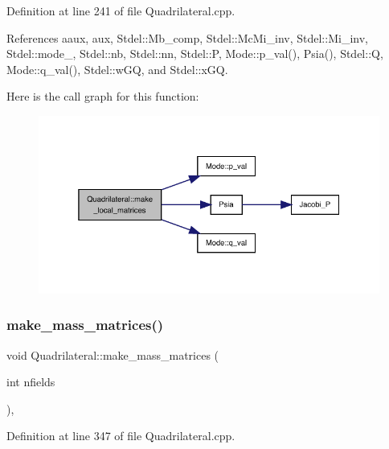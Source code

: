 Definition at line 241 of file Quadrilateral.\+cpp.



References aaux, aux, Stdel\+::\+Mb\+\_\+comp, Stdel\+::\+Mc\+Mi\+\_\+inv, Stdel\+::\+Mi\+\_\+inv, Stdel\+::mode\+\_\+, Stdel\+::nb, Stdel\+::nn, Stdel\+::P, Mode\+::p\+\_\+val(), Psia(), Stdel\+::Q, Mode\+::q\+\_\+val(), Stdel\+::w\+GQ, and Stdel\+::x\+GQ.

Here is the call graph for this function\+:
\nopagebreak
\begin{figure}[H]
\begin{center}
\leavevmode
\includegraphics[width=338pt]{classQuadrilateral_a250590faeb6a0218430f02ee040a1818_cgraph}
\end{center}
\end{figure}
\mbox{\label{classQuadrilateral_ac1150bb15b39c343031413121c767d70}} 
\subsubsection{\texorpdfstring{make\+\_\+mass\+\_\+matrices()}{make\_mass\_matrices()}}
{\footnotesize\ttfamily void Quadrilateral\+::make\+\_\+mass\+\_\+matrices (\begin{DoxyParamCaption}\item[{int}]{nfields }\end{DoxyParamCaption})\hspace{0.3cm}{\ttfamily [private]}, {\ttfamily [virtual]}}



Definition at line 347 of file Quadrilateral.\+cpp.

\mbox{\label{classQuadrilateral_a63ff83a9100d597f694d76b3d5f147a5}} 
